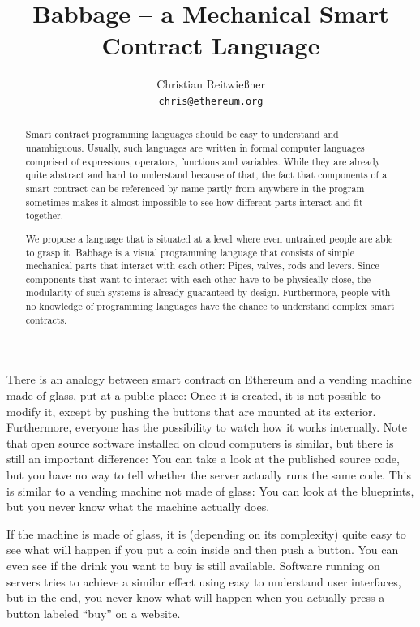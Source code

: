 \documentclass[11pt,letterpaper]{article}
\date{}
\begin{document}


\title{Babbage -- a Mechanical Smart Contract Language}

\author{Christian Reitwießner\\
{\tt chris@ethereum.org}}


\maketitle


\begin{abstract}
\noindent Smart contract programming languages should be easy to understand
and unambiguous. Usually, such languages are written in formal computer languages
comprised of expressions, operators, functions and variables. While they are
already quite abstract and hard to understand because of that,
the fact that components of a smart contract
can be referenced by name partly from anywhere in the program sometimes
makes it almost impossible to see how different parts interact and fit together.

We propose a language that is situated at a level where even untrained people
are able to grasp it. Babbage is a visual programming language that consists of simple
mechanical parts that interact with each other: Pipes, valves, rods and levers.
Since components that want to interact with each
other have to be physically close, the modularity of such systems is already
guaranteed by design. Furthermore, people with no knowledge of programming
languages have the chance to understand complex smart contracts.
\end{abstract}

There is an analogy between smart contract on Ethereum and a vending machine made of
glass, put at a public place:
Once it is created, it is not possible to modify it, except by pushing the buttons
that are mounted at its exterior. Furthermore, everyone has the possibility
to watch how it works internally. Note that open source software installed
on cloud computers is similar, but there is still an important difference:
You can take a look at the published source code, but you have no way to tell whether
the server actually runs the same code. This is similar to a vending machine
not made of glass: You can look at the blueprints, but you never know what
the machine actually does.

If the machine is made of glass, it is (depending on its complexity) quite
easy to see what will happen if you put a coin inside and then push a button.
You can even see if the drink you want to buy is still available. Software
running on servers tries to achieve a similar effect using easy to understand
user interfaces, but in the end, you never know what will happen when you
actually press a button labeled ``buy'' on a website.
\end{document}
